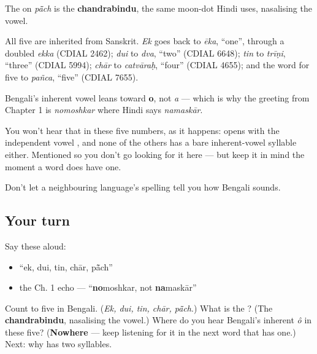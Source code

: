 The \textbf{} on \emph{pā̃ch} is the \textbf{chandrabindu}, the same moon-dot Hindi uses, nasalising the vowel.

\begin{cousinweb}
All five are inherited from Sanskrit. \emph{Ek} goes back to \emph{ēka}, \textquotedblleft{}one\textquotedblright{}, through a doubled \emph{ekka} (CDIAL 2462); \emph{dui} to \emph{dva}, \textquotedblleft{}two\textquotedblright{} (CDIAL 6648); \emph{tin} to \emph{trīṇi}, \textquotedblleft{}three\textquotedblright{} (CDIAL 5994); \emph{chār} to \emph{catvāraḥ}, \textquotedblleft{}four\textquotedblright{} (CDIAL 4655); and the word for five to \emph{pañca}, \textquotedblleft{}five\textquotedblright{} (CDIAL 7655).
\end{cousinweb}

\begin{sounds}
Bengali's inherent vowel leans toward \textbf{o}, not \emph{a} — which is why the greeting from Chapter 1 is \emph{nomoshkar} where Hindi says \emph{namaskār}.

You won't hear that in these five numbers, as it happens: \textbf{} opens with the independent vowel , and none of the others has a bare inherent-vowel syllable either. Mentioned so you don't go looking for it here — but keep it in mind the moment a word does have one.

Don't let a neighbouring language's spelling tell you how Bengali sounds.
\end{sounds}

\subsection*{Your turn}
Say these aloud:

\begin{itemize}
\raggedright
  \item \textquotedblleft{}ek, dui, tin, chār, pā̃ch\textquotedblright{}
  \item the Ch. 1 echo — \textquotedblleft{}\textbf{no}moshkar, not \textbf{na}maskār\textquotedblright{}
\end{itemize}

\begin{tcolorbox}[breakable,colback=teal!4,colframe=teal!35!black,title={Before you move on}]
Count to five in Bengali. (\emph{Ek, dui, tin, chār, pā̃ch}.) What is the \textbf{}? (The \textbf{chandrabindu}, nasalising the vowel.) Where do you hear Bengali's inherent \emph{ô} in these five? (\textbf{Nowhere} — keep listening for it in the next word that has one.) Next: why \textbf{} has two syllables.
\end{tcolorbox}

